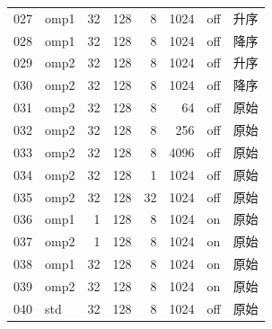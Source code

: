 \begin{longtable}{rlrrrrll}
027 & omp1 & 32 & 128 & 8 & 1024 & off & 升序\\
028 & omp1 & 32 & 128 & 8 & 1024 & off & 降序\\
029 & omp2 & 32 & 128 & 8 & 1024 & off & 升序\\
030 & omp2 & 32 & 128 & 8 & 1024 & off & 降序\\
031 & omp2 & 32 & 128 & 8 & 64 & off & 原始\\
032 & omp2 & 32 & 128 & 8 & 256 & off & 原始\\
033 & omp2 & 32 & 128 & 8 & 4096 & off & 原始\\
034 & omp2 & 32 & 128 & 1 & 1024 & off & 原始\\
035 & omp2 & 32 & 128 & 32 & 1024 & off & 原始\\
036 & omp1 & 1 & 128 & 8 & 1024 & on & 原始\\
037 & omp2 & 1 & 128 & 8 & 1024 & on & 原始\\
038 & omp1 & 32 & 128 & 8 & 1024 & on & 原始\\
039 & omp2 & 32 & 128 & 8 & 1024 & on & 原始\\
040 & std & 32 & 128 & 8 & 1024 & off & 原始\\
\end{longtable}
\endgroup
